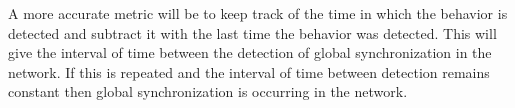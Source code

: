 \documentclass{article}
\begin{document}
A more accurate metric will be to keep track of the time in which the behavior is detected and subtract it with the last time the behavior was detected. This will give the interval of time between the detection of global synchronization in the network. If this is repeated and the interval of time between detection remains constant then global synchronization is occurring in the network.




\end{document}
